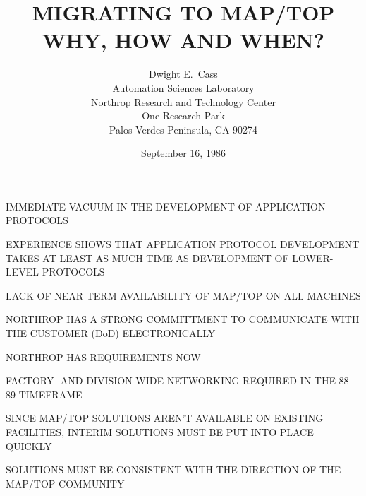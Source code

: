 


\raggedright


\small
\title	{MIGRATING TO MAP/TOP\\ WHY, HOW AND WHEN?}
\author	{Dwight E.~Cass\\
	Automation Sciences Laboratory\\
	Northrop Research and Technology Center\\
	One Research Park\\
	Palos Verdes Peninsula, CA  90274}
\date	{September 16, 1986}
\maketitlepage
\normalsize


\begin{bwslide}

\begin{nrtc}
\item	IMMEDIATE VACUUM IN THE DEVELOPMENT OF
	APPLICATION PROTOCOLS
    \begin{nrtc}
    \item	EXPERIENCE SHOWS THAT APPLICATION
		PROTOCOL DEVELOPMENT TAKES AT
		LEAST AS MUCH TIME AS DEVELOPMENT OF
 		LOWER-LEVEL PROTOCOLS
    \end{nrtc}
\end{nrtc}
\end{bwslide}


\begin{bwslide}

\begin{nrtc}
\item	LACK OF NEAR-TERM AVAILABILITY OF MAP/TOP ON ALL
	MACHINES
    \begin{nrtc}
    \item	NORTHROP HAS A STRONG COMMITTMENT
		TO COMMUNICATE WITH THE CUSTOMER (DoD) ELECTRONICALLY
    \end{nrtc}
\end{nrtc}
\end{bwslide}


\begin{bwslide}

\begin{nrtc}
\item	NORTHROP HAS REQUIREMENTS NOW
    \begin{nrtc}
    \item	FACTORY- AND DIVISION-WIDE NETWORKING
		REQUIRED IN THE 88--89 TIMEFRAME
    \item	SINCE MAP/TOP SOLUTIONS AREN'T AVAILABLE ON EXISTING
		FACILITIES,
		INTERIM SOLUTIONS MUST BE PUT INTO PLACE QUICKLY
    \item	SOLUTIONS MUST BE CONSISTENT WITH THE
		DIRECTION OF THE MAP/TOP COMMUNITY
    \end{nrtc}
\end{nrtc}
\end{bwslide}


